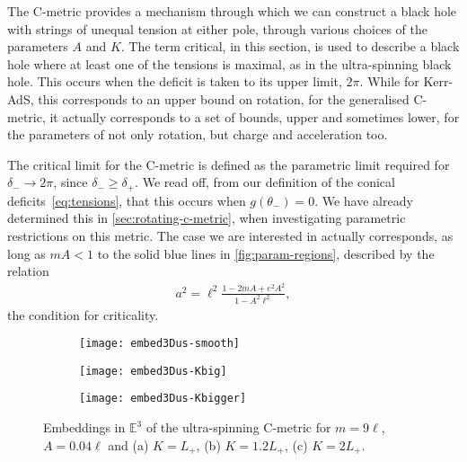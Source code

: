 \documentclass[
twoside,
openright,
frontopenright,
]{dmathesis}
\begin{document}

The C-metric provides a mechanism through which we can construct a black hole
with strings of unequal tension at either pole, through various choices of the
parameters $A$ and $K$. The term critical, in this section, is used to describe
a black hole where at least one of the tensions is maximal, as in the
ultra-spinning black hole. This occurs when the deficit is taken to its upper
limit, $2\pi$. While for Kerr-AdS, this corresponds to an upper bound on
rotation, for the generalised C-metric, it actually corresponds to a set of
bounds, upper and sometimes lower, for the parameters of not only rotation, but
charge and acceleration too.

The critical limit for the C-metric is defined as the parametric limit required
for $\delta_- \to 2\pi$, since $\delta_-\geqslant \delta_+$. We read off, from
our definition of the conical deficits~\eqref{eq:tensions}, that this occurs
when $g(\theta_-)=0$. We have already determined this in
\cref{sec:rotating-c-metric}, when investigating parametric restrictions on this
metric. The case we are interested in actually corresponds, as long as $mA < 1$
to the solid blue lines in \cref{fig:param-regions}, described by the relation
\begin{align}\label{eq:us}
a^2 = \ell^2 \frac{1-2mA+e^2A^2}{1-A^2\ell^2},
\end{align}
the condition for criticality.


\begin{figure}
\centering
\begin{subfigure}[b]{0.2\textwidth}
\texttt{[image: embed3Dus-smooth]}
\caption{\label{fig:embed3Dus-smooth}}
\end{subfigure}\qquad
\begin{subfigure}[b]{0.2\textwidth}
\texttt{[image: embed3Dus-Kbig]}
\caption{\label{fig:embed3Dus-Kbig}}
\end{subfigure}\qquad
\begin{subfigure}[b]{0.2\textwidth}
\texttt{[image: embed3Dus-Kbigger]}
\caption{\label{fig:embed3Dus-Kbigger}}
\end{subfigure}
\caption{\label{fig:embed3Dus}Embeddings in $\mathbb{E}^3$ of the ultra-spinning
  C-metric for $m=9\ell$, $A=0.04\ell$ and (a) $K=L_+$, (b) $K=1.2L_+$, (c)
  $K=2L_+$.} 
\end{figure}
\end{document}
